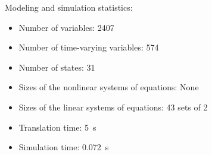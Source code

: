 \begin{contextbox}
  Modeling and simulation statistics:
  \begin{itemize}
    \item Number of variables: 2407
    \item Number of time-varying variables: 574
    \item Number of states: 31
    \item Sizes of the nonlinear systems of equations: None
    \item Sizes of the linear systems of equations: 43 sets of 2
    \item Translation time: \SI{5}{s}
    \item Simulation time: \SI{0.072}{s}
  \end{itemize}
\end{contextbox}